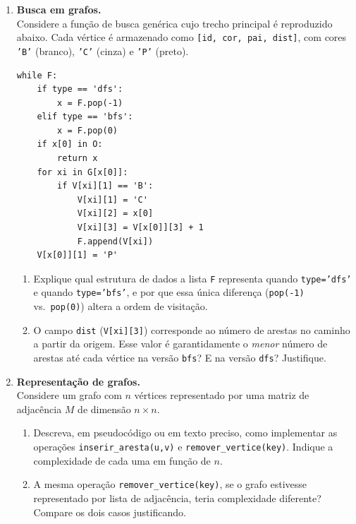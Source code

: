\documentclass[10pt,a4paper]{extarticle}
\begin{document}
\begin{enumerate}[label=\textbf{\arabic*.}, itemsep=0.7cm, leftmargin=*]

\item \textbf{Busca em grafos.} \\
Considere a função de busca genérica cujo trecho principal é reproduzido abaixo. Cada vértice é armazenado como \texttt{[id, cor, pai, dist]}, com cores \texttt{'B'} (branco), \texttt{'C'} (cinza) e \texttt{'P'} (preto).

\begin{lstlisting}
while F:
    if type == 'dfs':
        x = F.pop(-1)
    elif type == 'bfs':
        x = F.pop(0)
    if x[0] in O:
        return x
    for xi in G[x[0]]:
        if V[xi][1] == 'B':
            V[xi][1] = 'C'
            V[xi][2] = x[0]
            V[xi][3] = V[x[0]][3] + 1
            F.append(V[xi])
    V[x[0]][1] = 'P'
\end{lstlisting}

\begin{enumerate}[label=(\alph*)]
    \item Explique qual estrutura de dados a lista \texttt{F} representa quando \texttt{type='dfs'} e quando \texttt{type='bfs'}, e por que essa única diferença (\texttt{pop(-1)} vs.\ \texttt{pop(0)}) altera a ordem de visitação.
    \item O campo \texttt{dist} (\texttt{V[xi][3]}) corresponde ao número de arestas no caminho a partir da origem. Esse valor é garantidamente o \emph{menor} número de arestas até cada vértice na versão \texttt{bfs}? E na versão \texttt{dfs}? Justifique.
\end{enumerate}

\item \textbf{Representação de grafos.} \\
Considere um grafo com $n$ vértices representado por uma matriz de adjacência $M$ de dimensão $n \times n$.

\begin{enumerate}[label=(\alph*)]
    \item Descreva, em pseudocódigo ou em texto preciso, como implementar as operações \texttt{inserir\_aresta(u,v)} e \texttt{remover\_vertice(key)}. Indique a complexidade de cada uma em função de $n$.
    \item A mesma operação \texttt{remover\_vertice(key)}, se o grafo estivesse representado por lista de adjacência, teria complexidade diferente? Compare os dois casos justificando.
\end{enumerate}


\end{enumerate}
\end{document}
